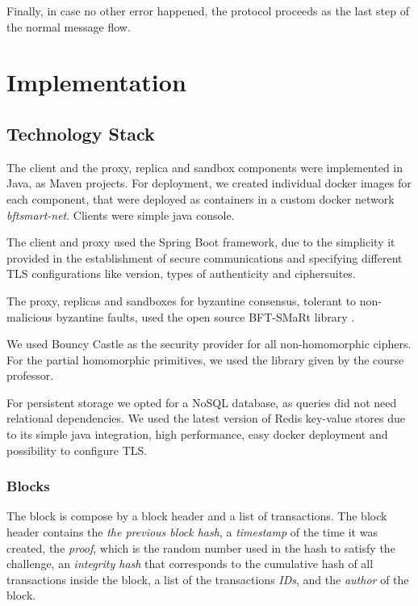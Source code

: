 \documentclass[10pt,journal,compsoc]{IEEEtran}
\begin{document}
    Finally, in case no other error happened, the protocol proceeds as the last step of the normal message flow.
	
	\section{Implementation}
	
	\subsection{Technology Stack}
	
	The client and the proxy, replica and sandbox components were implemented in Java, as Maven projects. For deployment, we created individual docker images for each component, that were deployed as containers in a custom docker network \textit{bftsmart-net}. Clients were simple java console.
	
	The client and proxy used the Spring Boot framework, due to the simplicity it provided in the establishment of secure communications and specifying different TLS configurations like version, types of authenticity and ciphersuites. 
	
	The proxy, replicas and sandboxes for byzantine consensus, tolerant to non-malicious byzantine faults, used the open source BFT-SMaRt library \cite{bessani2014stateBFTSMART}.
	
	We used Bouncy Castle as the security provider for all non-homomorphic ciphers. For the partial homomorphic primitives, we used the library given by the course professor.
	
	For persistent storage we opted for a NoSQL database, as queries did not need relational dependencies. We used the latest version of Redis key-value stores due to its simple java integration, high performance, easy docker deployment and possibility to configure TLS. 
	
	\subsubsection{Blocks}
	
	The block is compose by a block header and a list of transactions.
	The block header contains the \textit{the previous block hash}, a \textit{timestamp} of the time it was created, the \textit{proof}, which is the random number used in the hash to satisfy the challenge, an \textit{integrity hash} that corresponds to the cumulative hash of all transactions inside the block, a list of the transactions \textit{IDs}, and the \textit{author} of the block.
	
\end{document}
